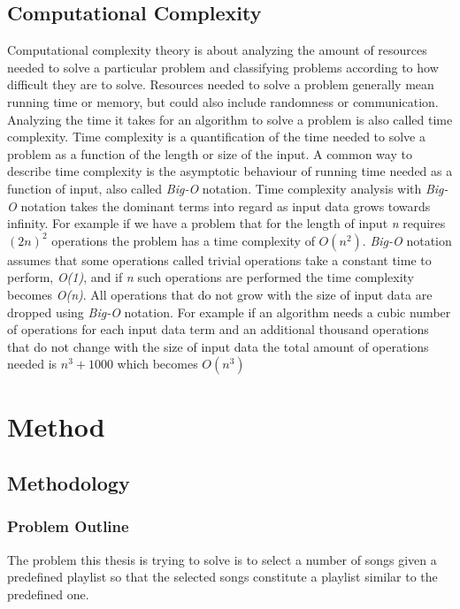 \documentclass[a4paper,11pt]{kth-mag}
\begin{document}
\chapter{Computational Complexity}
Computational complexity theory is about analyzing the amount of resources needed to solve a particular problem and classifying problems according to how difficult they are to solve. Resources needed to solve a problem generally mean running time or memory, but could also include randomness or communication. Analyzing the time it takes for an algorithm to solve a problem is also called time complexity. Time complexity is a quantification of the time needed to solve a problem as a function of the length or size of the input. A common way to describe time complexity is the asymptotic behaviour of running time needed as a function of input, also called \textit{Big-O} notation. Time complexity analysis with \textit{Big-O} notation takes the dominant terms into regard as input data grows towards infinity. For example if we have a problem that for the length of input \textit{n} requires $(2n)^2$ operations the problem has a time complexity of $O(n^2)$. \textit{Big-O} notation assumes that some operations called trivial operations take a constant time to perform, \textit{O(1)}, and if \textit{n} such operations are performed the time complexity becomes \textit{O(n)}. All operations that do not grow with the size of input data are dropped using \textit{Big-O} notation. For example if an algorithm needs a cubic number of operations for each input data term and an additional thousand operations that do not change with the size of input data the total amount of operations needed is $n^3 + 1000$ which becomes $O(n^3)$

\part{Method}

\chapter{Methodology}

\section{Problem Outline}
The problem this thesis is trying to solve is to select a number of songs given a predefined playlist so that the selected songs constitute a playlist similar to the predefined one. 
\end{document}
